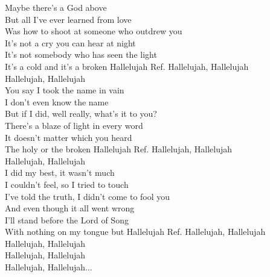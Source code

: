 \begin{flushleft}
\hops
Maybe there’s a God above\\
But all I’ve ever learned from love\\
Was how to shoot at someone who outdrew you\\
It’s not a cry you can hear at night\\
It’s not somebody who has seen the light\\
It’s a cold and it’s a broken Hallelujah
\hops
Ref. Hallelujah, Hallelujah\\
\hspace{0.9cm}Hallelujah, Hallelujah\\
\hops
You say I took the name in vain\\
I don't even know the name\\
But if I did, well really, what's it to you?\\
There's a blaze of light in every word\\
It doesn't matter which you heard\\
The holy or the broken Hallelujah
\hops
Ref. Hallelujah, Hallelujah\\
\hspace{0.9cm}Hallelujah, Hallelujah\\
\hops
I did my best, it wasn't much\\
I couldn't feel, so I tried to touch\\
I've told the truth, I didn't come to fool you\\
And even though it all went wrong\\
I'll stand before the Lord of Song\\
With nothing on my tongue but Hallelujah
\hops
Ref. Hallelujah, Hallelujah\\
\hspace{0.9cm}Hallelujah, Hallelujah\\
\hspace{0.9cm}Hallelujah, Hallelujah\\
\hspace{0.9cm}Hallelujah, Hallelujah...
\end{flushleft}
\newpage